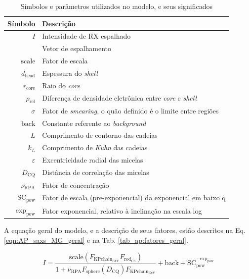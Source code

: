 \begin{apendicesenv}
\begin{table}
    \IBGEtab%
    {\caption{Símbolos e parâmetros utilizados no modelo, e seus significados}
     \label{tab_ap:simbolos} }%
    {\begin{tabular}{r p{8cm}}
    	\toprule
     Símbolo 			    & Descrição        						\\    \midrule
     \(I\)					& Intensidade de RX espalhado			\\
     \q					    & Vetor de espalhamento					\\    \midrule
     \(\mathrm{scale}\)				& Fator de escala						\\
     \(d_{\mathrm{head}}\)			& Espessura do \emph{shell}				\\
     \(r_{\mathrm{core}}\)			& Raio do \emph{core}					\\
     \(\rho_{\mathrm{rel}}\)		    & Diferença de densidade eletrônica entre \emph{core} e \emph{shell} \\
     \(\sigma\)			    & Fator de \emph{smearing}, o quão definido é o limite entre regiões \\
     \(\mathrm{back}\)				& Constante referente ao \emph{background} \\
     \(L\)					& Comprimento de contorno das cadeias 	\\
     \(k_L\)				& Comprimento de \emph{Kuhn} das cadeias\\
     \(\varepsilon\)		& Excentricidade radial das micelas		\\
     \(D_{\mathrm{CQ}}\)			    & Distância de correlação das micelas 	\\
     \(\nu_{\mathrm{RPA}}\)			& Fator de concentração					\\ \midrule
     \(\mathrm{SC}_{\mathrm{pow}}\)			& Fator de escala (pre-exponencial) da exponencial em baixo q\\
     \(\mathrm{exp}_{\mathrm{pow}}\)			& Fator exponencial, relativo à inclinação na escala log\\ \bottomrule
    \end{tabular}}%
    {}%
\end{table}

A equação geral do modelo, e a descrição de seus fatores, estão descritos na Eq.\ref{eqn:AP_saxs_MG_geral} e na Tab. \ref{tab_ap:fatores_geral}.

\begin{equation}
I = \frac{\mathrm{scale}\left(F_{\mathrm{KPchain}_{\mathrm{ExV}}}F_{\mathrm{rod}_{\mathrm{CS}}}\right)}{1 + \nu_{\mathrm{RPA}} F_{\mathrm{sphere}}\left( D_{\mathrm{CQ}}\right) F_{\mathrm{KPchain}_{\mathrm{ExV}}}} + \mathrm{back} + \mathrm{SC}_{\mathrm{pow}}^{-\mathrm{exp}_{\mathrm{pow}}}
\label{eqn:AP_saxs_MG_geral}
\end{equation}


\end{apendicesenv}
